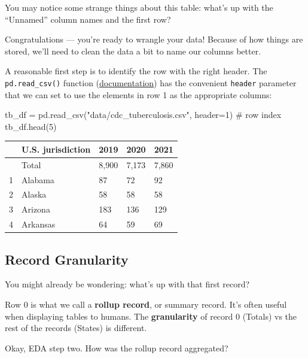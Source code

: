 \documentclass[
  letterpaper,
  DIV=11,
  numbers=noendperiod]{scrreprt}
\newenvironment{Shaded}{\begin{snugshade}}{\end{snugshade}}
\newcommand{\CommentTok}[1]{\textcolor[rgb]{0.37,0.37,0.37}{#1}}
\newcommand{\DecValTok}[1]{\textcolor[rgb]{0.68,0.00,0.00}{#1}}
\newcommand{\NormalTok}[1]{\textcolor[rgb]{0.00,0.23,0.31}{#1}}
\newcommand{\OperatorTok}[1]{\textcolor[rgb]{0.37,0.37,0.37}{#1}}
\newcommand{\StringTok}[1]{\textcolor[rgb]{0.13,0.47,0.30}{#1}}
\begin{document}
You may notice some strange things about this table: what's up with the
``Unnamed'' column names and the first row?

Congratulations --- you're ready to wrangle your data! Because of how
things are stored, we'll need to clean the data a bit to name our
columns better.

A reasonable first step is to identify the row with the right header.
The \texttt{pd.read\_csv()} function
(\href{https://pandas.pydata.org/docs/reference/api/pandas.read_csv.html}{documentation})
has the convenient \texttt{header} parameter that we can set to use the
elements in row 1 as the appropriate columns:

\begin{Shaded}
\begin{Highlighting}[]
\NormalTok{tb\_df }\OperatorTok{=}\NormalTok{ pd.read\_csv(}\StringTok{"data/cdc\_tuberculosis.csv"}\NormalTok{, header}\OperatorTok{=}\DecValTok{1}\NormalTok{) }\CommentTok{\# row index}
\NormalTok{tb\_df.head(}\DecValTok{5}\NormalTok{)}
\end{Highlighting}
\end{Shaded}

\begin{longtable}[]{@{}lllll@{}}
\toprule\noalign{}
& U.S. jurisdiction & 2019 & 2020 & 2021 \\
\midrule\noalign{}
\endhead
\bottomrule\noalign{}
\endlastfoot
0 & Total & 8,900 & 7,173 & 7,860 \\
1 & Alabama & 87 & 72 & 92 \\
2 & Alaska & 58 & 58 & 58 \\
3 & Arizona & 183 & 136 & 129 \\
4 & Arkansas & 64 & 59 & 69 \\
\end{longtable}

\subsection{Record Granularity}\label{record-granularity}

You might already be wondering: what's up with that first record?

Row 0 is what we call a \textbf{rollup record}, or summary record. It's
often useful when displaying tables to humans. The \textbf{granularity}
of record 0 (Totals) vs the rest of the records (States) is different.

Okay, EDA step two. How was the rollup record aggregated?
\end{document}
